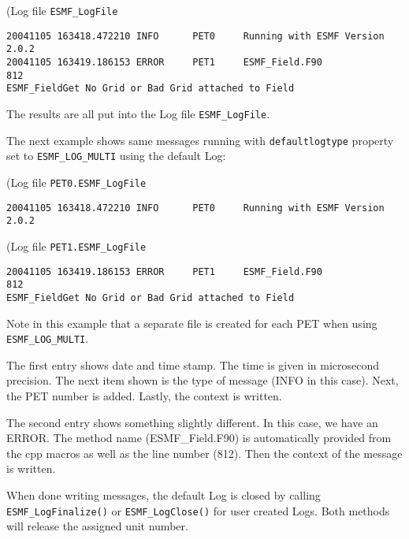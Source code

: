 (Log file {\tt ESMF\_LogFile}
\begin {verbatim}
20041105 163418.472210 INFO      PET0     Running with ESMF Version 2.0.2   
20041105 163419.186153 ERROR     PET1     ESMF_Field.F90             812  
ESMF_FieldGet No Grid or Bad Grid attached to Field
\end {verbatim}

The results are all put into the Log file {\tt ESMF\_LogFile}.

The next example shows same messages running with {\tt defaultlogtype} 
property set to {\tt ESMF\_LOG\_MULTI} using the default Log:

(Log file {\tt PET0.ESMF\_LogFile}
\begin {verbatim}
20041105 163418.472210 INFO      PET0     Running with ESMF Version 2.0.2   
\end {verbatim}

(Log file {\tt PET1.ESMF\_LogFile}
\begin {verbatim}
20041105 163419.186153 ERROR     PET1     ESMF_Field.F90             812  
ESMF_FieldGet No Grid or Bad Grid attached to Field
\end {verbatim}

Note in this example that a separate file is created for each PET when using
{\tt ESMF\_LOG\_MULTI}.

The first entry shows date and time stamp.  The time is given in microsecond 
precision.  The next item shown is the type of message (INFO in this case).  
Next, the PET number is added.  Lastly, the context is written.

The second entry shows something slightly different.  In this case, we have
an ERROR.  The method name (ESMF\_Field.F90) is automatically provided from 
the cpp macros as well as the line number (812).  Then the context of the 
message is written.
 
When done writing messages, the default Log is closed by calling 
{\tt ESMF\_LogFinalize()}  or {\tt ESMF\_LogClose()} for user created Logs.  
Both methods will release the assigned unit number.




